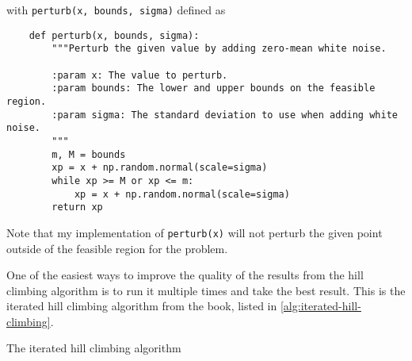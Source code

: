 \documentclass{article}
\begin{document}
with \texttt{perturb(x, bounds, sigma)} defined as

\begin{verbatim}
    def perturb(x, bounds, sigma):
        """Perturb the given value by adding zero-mean white noise.

        :param x: The value to perturb.
        :param bounds: The lower and upper bounds on the feasible region.
        :param sigma: The standard deviation to use when adding white noise.
        """
        m, M = bounds
        xp = x + np.random.normal(scale=sigma)
        while xp >= M or xp <= m:
            xp = x + np.random.normal(scale=sigma)
        return xp
\end{verbatim}

Note that my implementation of \texttt{perturb(x)} will not perturb the given point
outside of the feasible region for the problem.

One of the easiest ways to improve the quality of the results from the hill climbing algorithm is
to run it multiple times and take the best result. This is the iterated hill climbing algorithm
from the book, listed in \autoref{alg:iterated-hill-climbing}.

\begin{algorithm}[h]
    \begin{algorithmic}
            \State{}
        \EndFunction{}
    \end{algorithmic}
    \caption{The iterated hill climbing algorithm}\label{alg:iterated-hill-climbing}
\end{algorithm}
\end{document}
